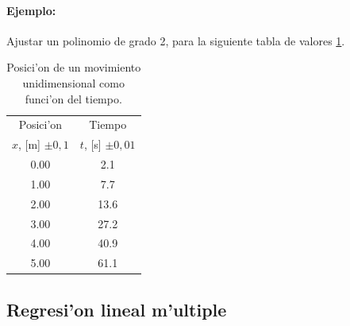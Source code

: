 \documentclass[a4paper]{report}
\begin{document}

\paragraph{Ejemplo:}  Ajustar un polinomio de grado 2, para la siguiente tabla de valores \ref{tab-xt}.

\begin{table}[h!]
\begin{center}
\begin{tabular}{|c|c|}
\hline 
Posici'on & Tiempo \\ 
$x$, [m] $\pm 0,1$ & $t$, [s] $\pm 0,01$ \\ \hline
0.00 & 2.1 \\ \hline
1.00 & 7.7 \\ \hline
2.00 & 13.6\\ \hline
3.00 & 27.2\\ \hline
4.00 & 40.9\\ \hline
5.00 & 61.1\\ \hline
\end{tabular}
\caption{Posici'on de un movimiento unidimensional como funci'on del tiempo.}
\label{tab-xt}
\end{center}
\end{table}

\subsection{Regresi'on lineal m'ultiple}
\end{document}
